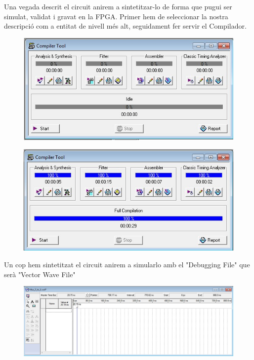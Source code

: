 \documentclass[12pt, a4papre]{article}
\begin{document}
	Una vegada descrit el circuit anirem a sintetitzar-lo de forma que pugui ser
simulat, validat i gravat en la FPGA. Primer hem de seleccionar la nostra descripció com a entitat de nivell més alt, seguidament fer servir el Compilador.
		\begin{figure}[H]
		\begin{center}
		\includegraphics[width=150mm]{simulador.jpeg}
		\end{center}
	\end{figure}
	\begin{figure}[H]
		\begin{center}
		\includegraphics[width=150mm]{simuladorfet.jpeg}
		\end{center}
	\end{figure}
	
	Un cop hem sintetitzat el circuit anirem a simularlo amb el "Debugging File" que serà "Vector Wave File"
	
	\begin{figure}[H]
		\begin{center}
		\includegraphics[width=150mm]{waveform.jpeg}
		\end{center}
	\end{figure}
	
\end{document}

